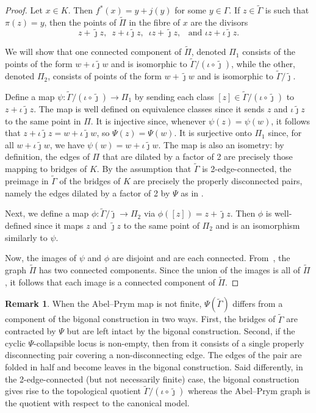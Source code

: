 \documentclass[11pt]{article}
\theoremstyle{definition}
\newtheorem{rema}[theo]{Remark}
\numberwithin{equation}{section}
\theoremstyle{definition}
\newcommand{\tGa}{\widetilde{\Gamma}}
\newcommand{\tj}{\widetilde{\jmath}}
\newcommand{\wt}[1]{\widetilde{#1}}
\begin{document}
 \begin{proof}
 Let $x\in K$. Then $f^*(x) = y + j(y)$ for some $y\in\Gamma$. If $z\in\wt\Gamma$ is such that $\pi(z) = y$, then the points of $\wt\Pi$ in the fibre of $x$ are the divisors
 \[
 z + \tj z,\,\,\, z+\iota\tj z,\,\,\, \iota z + \tj z,\,\,\, \text{ and } \iota z + \iota\tj z.
 \]

We will show that one connected component of $\wt \Pi$, denoted $\Pi_1$  consists of the points of the form $w + \iota\tj w$ and is isomorphic to $\wt\Gamma/(\iota\circ\tj)$, while the other, denoted $\Pi_2$,  consists of  points of the form $w + \tj w$ and is isomorphic to $\wt\Gamma/\tj$. 

Define a map  $\psi:\tGa/(\iota\circ\tj)\to \Pi_1$ by sending each class $[z]\in \tGa/(\iota\circ\tj)$ to $z + \iota\tj z$. The map is well defined on equivalence classes since it sends $z$ and $\iota\tj z$ to the same point in $\Pi$. It is injective since, whenever $\psi(z) = \psi(w)$, it follows that $z + \iota\tj z = w + \iota\tj w$, so $\Psi(z) = \Psi(w)$. It is surjective onto $\Pi_1$ since, for all $w+\iota\tj w$, we have $\psi(w) = w+\iota\tj w$. The map is also an isometry: by definition, the edges of $\Pi$ that are dilated by a factor of 2 are precisely those mapping to bridges of $K$. By the assumption that $\wt\Gamma$ is 2-edge-connected, the preimage in $\wt\Gamma$ of the bridges of $K$ are precisely the properly disconnected pairs, namely the edges dilated by a factor of 2 by $\Psi$ as in . 

Next, we define a map $\phi:\wt\Gamma/\tj\to \Pi_2$ via $\phi([z]) = z + \tj z$. Then $\phi$ is well-defined since it maps $z$ and $\tj z$ to the same point of $\Pi_2$ and is an isomorphism similarly to $\psi$. 

Now, the images of $\psi$ and $\phi$ are disjoint and are each connected. From~\cite[Proposition 2.5]{RZ_ngonal}, the graph $\wt \Pi$ has two connected components. 
Since the union of the images is all of $\wt \Pi$, it follows that each image is a connected component of $\wt \Pi$.  
 \end{proof}


\begin{rema}\label{rem:bigonalForNonFiniteAP}
When the Abel--Prym map is not finite, $\Psi(\wt\Gamma)$ differs from a component of the bigonal construction in two ways. First,  the bridges of   $\wt\Gamma$ are contracted by $\Psi$ but are left intact by the bigonal construction.  Second, if the cyclic $\Psi$-collapsible locus is non-empty, then from  it consists of a single properly disconnecting pair covering a non-disconnecting edge. The edges of the pair are  folded in half and become leaves in the bigonal construction. Said differently, in the 2-edge-connected (but not necessarily finite) case, the bigonal construction gives rise to the topological quotient $\wt\Gamma/(\iota\circ\tj)$ whereas the Abel--Prym graph is the quotient with respect to the canonical model. 
\end{rema}
\end{document}
